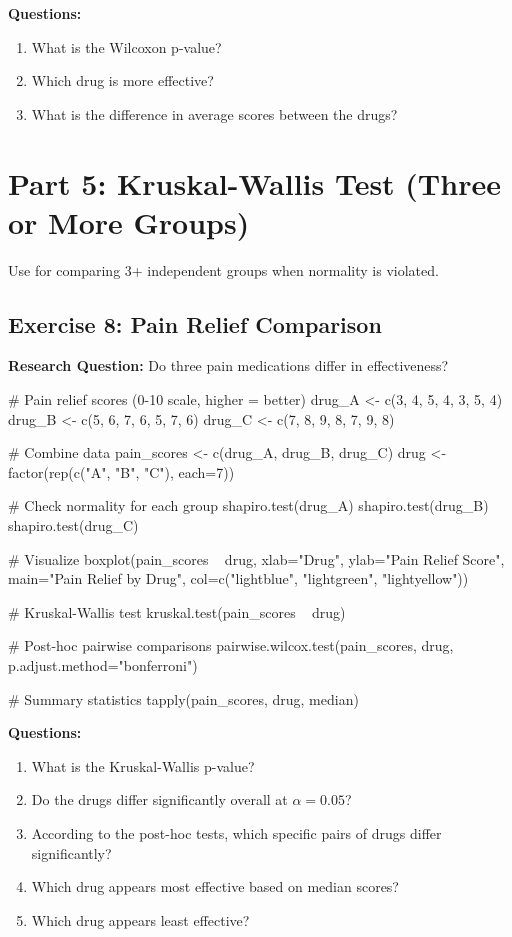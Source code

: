 \documentclass[11pt]{article}
\begin{document}
\textbf{Questions:}
\begin{enumerate}
\item What is the Wilcoxon p-value?
\item Which drug is more effective?
\item What is the difference in average scores between the drugs?
\end{enumerate}

\vspace{1cm}

\section{Part 5: Kruskal-Wallis Test (Three or More Groups)}

Use for comparing 3+ independent groups when normality is violated.

\subsection{Exercise 8: Pain Relief Comparison}

\textbf{Research Question:} Do three pain medications differ in effectiveness?

\begin{rcode}
# Pain relief scores (0-10 scale, higher = better)
drug_A <- c(3, 4, 5, 4, 3, 5, 4)
drug_B <- c(5, 6, 7, 6, 5, 7, 6)
drug_C <- c(7, 8, 9, 8, 7, 9, 8)

# Combine data
pain_scores <- c(drug_A, drug_B, drug_C)
drug <- factor(rep(c("A", "B", "C"), each=7))

# Check normality for each group
shapiro.test(drug_A)
shapiro.test(drug_B)
shapiro.test(drug_C)

# Visualize
boxplot(pain_scores ~ drug,
        xlab="Drug",
        ylab="Pain Relief Score",
        main="Pain Relief by Drug",
        col=c("lightblue", "lightgreen", "lightyellow"))

# Kruskal-Wallis test
kruskal.test(pain_scores ~ drug)

# Post-hoc pairwise comparisons
pairwise.wilcox.test(pain_scores, drug, p.adjust.method="bonferroni")

# Summary statistics
tapply(pain_scores, drug, median)
\end{rcode}

\textbf{Questions:}
\begin{enumerate}
\item What is the Kruskal-Wallis p-value?
\item Do the drugs differ significantly overall at $\alpha = 0.05$?
\item According to the post-hoc tests, which specific pairs of drugs differ significantly?
\item Which drug appears most effective based on median scores?
\item Which drug appears least effective?
\end{enumerate}
\end{document}
